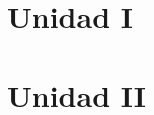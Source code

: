 \documentclass{article}
\begin{document}
    \section{Unidad I}
    

    \section{Unidad II}
    
\end{document}
